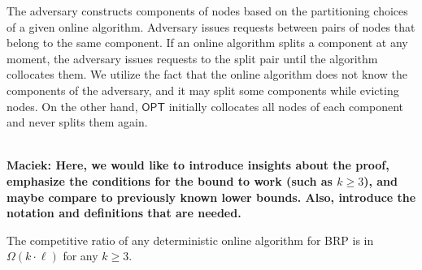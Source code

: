\documentclass[manuscript,screen=true, review, anonymous]{acmart}
\newcommand{\OPT}{\textsf{OPT}\xspace}
\newcommand{\OBRP}{BRP}
\newcommand\maciek[1]{\color{brown}\textbf{\\ Maciek: #1}\color{black}}
\begin{document}
The adversary constructs components of nodes based on the partitioning choices of a given online algorithm.
Adversary issues requests between pairs of nodes that belong to the same component.
If an online algorithm splits a component at any moment,
the adversary issues requests to the split pair until the algorithm collocates them.
We utilize the fact that the online algorithm does not know the components of the adversary, and it may split some components while evicting nodes.
On the other hand, $\OPT$ initially collocates all nodes of each component and never splits them again.

\maciek{Here, we would like to introduce insights about the proof, emphasize the conditions for the bound to work (such as $k\geq 3$), and maybe compare to previously known lower bounds. Also, introduce the notation and definitions that are needed.}

\begin{theorem}
	The competitive ratio of any deterministic online algorithm for \OBRP{} is in $\Omega(k\cdot \ell)$ for any $k\geq 3$.
\end{theorem}
\end{document}
